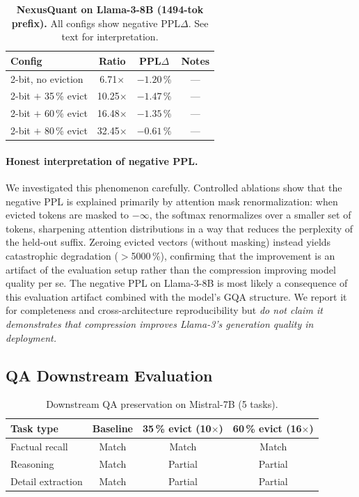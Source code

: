 \documentclass{article}
\begin{document}
\begin{table}[t]
\centering
\caption{\textbf{NexusQuant on Llama-3-8B (1494-tok prefix).} All configs show
  negative PPL$\Delta$. See text for interpretation.}
\label{tab:llama}
\begin{tabular}{@{}lccc@{}}
\toprule
Config & Ratio & PPL$\Delta$ & Notes \\
\midrule
2-bit, no eviction & 6.71$\times$ & $-1.20$\,\% & --- \\
2-bit $+$ 35\,\% evict & 10.25$\times$ & $-1.47$\,\% & --- \\
2-bit $+$ 60\,\% evict & 16.48$\times$ & $-1.35$\,\% & --- \\
2-bit $+$ 80\,\% evict & 32.45$\times$ & $-0.61$\,\% & --- \\
\bottomrule
\end{tabular}
\end{table}

\paragraph{Honest interpretation of negative PPL.}
We investigated this phenomenon carefully. Controlled ablations show that
the negative PPL is explained primarily by attention mask renormalization:
when evicted tokens are masked to $-\infty$, the softmax renormalizes over
a smaller set of tokens, sharpening attention distributions in a way that
reduces the perplexity of the held-out suffix. Zeroing evicted vectors
(without masking) instead yields catastrophic degradation ($>$5000\,\%),
confirming that the improvement is an artifact of the evaluation setup rather
than the compression improving model quality per se. The negative PPL on
Llama-3-8B is most likely a consequence of this evaluation artifact combined
with the model's GQA structure. We report it for completeness and cross-architecture
reproducibility but \emph{do not claim it demonstrates that compression improves
Llama-3's generation quality in deployment.}

\subsection{QA Downstream Evaluation}
\label{sec:qa}

\begin{table}[t]
\centering
\caption{Downstream QA preservation on Mistral-7B (5 tasks).}
\label{tab:qa}
\begin{tabular}{@{}lccc@{}}
\toprule
Task type & Baseline & 35\,\% evict (10$\times$) & 60\,\% evict (16$\times$) \\
\midrule
Factual recall  & Match & Match   & Match   \\
Reasoning       & Match & Partial & Partial \\
Detail extraction & Match & Partial & Partial \\
\bottomrule
\end{tabular}
\end{table}
\end{document}
